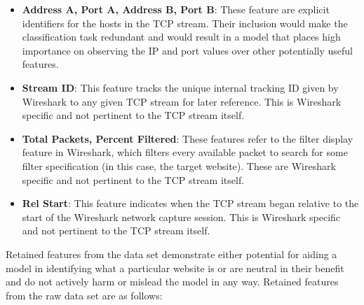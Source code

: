 \documentclass[10pt,sigconf,letterpaper,nonacm]{acmart}
\begin{document}
\begin{itemize}
  \item \textbf{Address A, Port A, Address B, Port B}: These feature are explicit identifiers for the hosts in the TCP stream. Their inclusion would make the classification task redundant and would result in a model that places high importance on observing the IP and port values over other potentially useful features.
  
  \item \textbf{Stream ID}: This feature tracks the unique internal tracking ID given by Wireshark to any given TCP stream for later reference. This is Wireshark specific and not pertinent to the TCP stream itself.
  
  \item \textbf{Total Packets, Percent Filtered}: These features refer to the filter display feature in Wireshark, which filters every available packet to search for some filter specification (in this case, the target website). These are Wireshark specific and not pertinent to the TCP stream itself.
  
  \item \textbf{Rel Start}: This feature indicates when the TCP stream began relative to the start of the Wireshark network capture session. This is Wireshark specific and not pertinent to the TCP stream itself.
\end{itemize}

Retained features from the data set demonstrate either potential for aiding a model in identifying what a particular website is or are neutral in their benefit and do not actively harm or mislead the model in any way.
Retained features from the raw data set are as follows:
\end{document}
